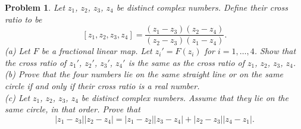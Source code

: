 \documentclass{article}
\newtheorem{problem}{Problem}
\begin{document}
\begin{problem}
Let $z_1$, $z_2$, $z_3$, $z_4$ be distinct complex numbers. Define their \emph{cross ratio} to be
\[
[z_1, z_2, z_3, z_4] = \frac{(z_1-z_3)(z_2-z_4)}{(z_2-z_3)(z_1-z_4)}.
\]
(a) Let $F$ be a fractional linear map. Let $z_i' = F(z_i)$ for $i = 1, \dots , 4$. Show that the cross ratio of $z_1'$, $z_2'$, $z_3'$, $z_4'$ is the same as the cross ratio of $z_1$, $z_2$, $z_3$, $z_4$.\\
(b) Prove that the four numbers lie on the same straight line or on the same circle if and only if their cross ratio is a real number.\\
(c) Let $z_1$, $z_2$, $z_3$, $z_4$ be distinct complex numbers. Assume that they lie on the same circle, in that order. Prove that
\[
|z_1 - z_3||z_2 - z_4| = |z_1 - z_2||z_3 - z_4| + |z_2 - z_3||z_4 - z_1|.
\]
\end{problem}
\end{document}
